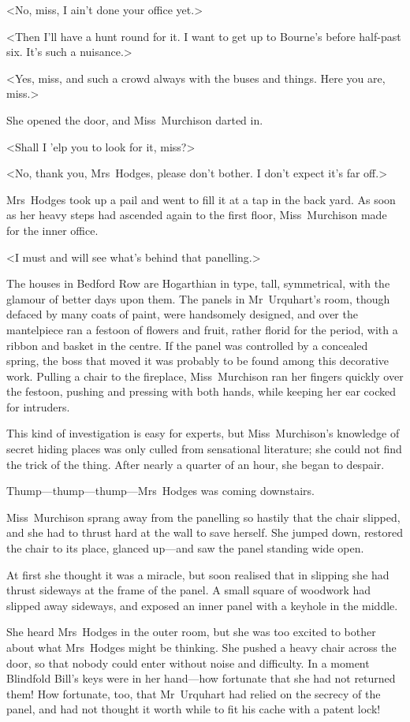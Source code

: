 <No, miss, I ain't done your office yet.>

<Then I'll have a hunt round for it. I want to get up to Bourne's before half-past six. It's such a nuisance.>

<Yes, miss, and such a crowd always with the buses and things. Here you are, miss.>

She opened the door, and Miss~Murchison darted in.

<Shall I 'elp you to look for it, miss?>

<No, thank you, Mrs~Hodges, please don't bother. I don't expect it's far off.>

Mrs~Hodges took up a pail and went to fill it at a tap in the back yard. As soon as her heavy steps had ascended again to the first floor, Miss~Murchison made for the inner office.

<I must and will see what's behind that panelling.>

The houses in Bedford Row are Hogarthian in type, tall, symmetrical, with the glamour of better days upon them. The panels in Mr~Urquhart's room, though defaced by many coats of paint, were handsomely designed, and over the mantelpiece ran a festoon of flowers and fruit, rather florid for the period, with a ribbon and basket in the centre. If the panel was controlled by a concealed spring, the boss that moved it was probably to be found among this decorative work. Pulling a chair to the fireplace, Miss~Murchison ran her fingers quickly over the festoon, pushing and pressing with both hands, while keeping her ear cocked for intruders.

This kind of investigation is easy for experts, but Miss~Murchison's knowledge of secret hiding places was only culled from sensational literature; she could not find the trick of the thing. After nearly a quarter of an hour, she began to despair.

Thump—thump—thump—Mrs~Hodges was coming downstairs.

Miss~Murchison sprang away from the panelling so hastily that the chair slipped, and she had to thrust hard at the wall to save herself. She jumped down, restored the chair to its place, glanced up—and saw the panel standing wide open.

At first she thought it was a miracle, but soon realised that in slipping she had thrust sideways at the frame of the panel. A small square of woodwork had slipped away sideways, and exposed an inner panel with a keyhole in the middle.

She heard Mrs~Hodges in the outer room, but she was too excited to bother about what Mrs~Hodges might be thinking. She pushed a heavy chair across the door, so that nobody could enter without noise and difficulty. In a moment Blindfold Bill's keys were in her hand—how fortunate that she had not returned them! How fortunate, too, that Mr~Urquhart had relied on the secrecy of the panel, and had not thought it worth while to fit his cache with a patent lock!

